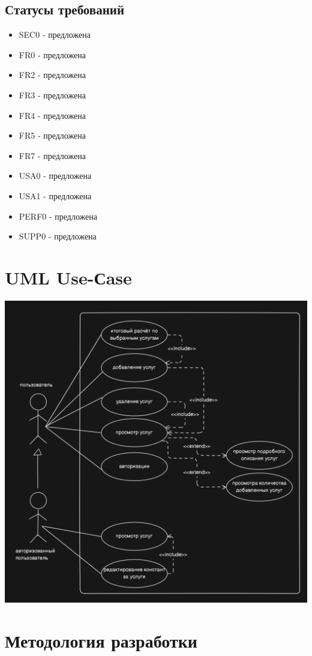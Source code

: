 \documentclass{article}
\begin{document}
\subsection{Статусы требований}
\begin{itemize} 
    \item SEC0 - предложена
    \item FR0 - предложена
    \item FR2 - предложена
    \item FR3 - предложена
    \item FR4 - предложена
    \item FR5 - предложена
     \item FR7 - предложена
    \item USA0 - предложена
    \item USA1 - предложена
    \item PERF0 - предложена
    \item SUPP0 - предложена
\end{itemize}

\section{UML Use-Сase}
\begin{center}
    \includegraphics[width=.9\textwidth]{uml.png}
\end{center}

\section{Методология разработки}
\end{document}
